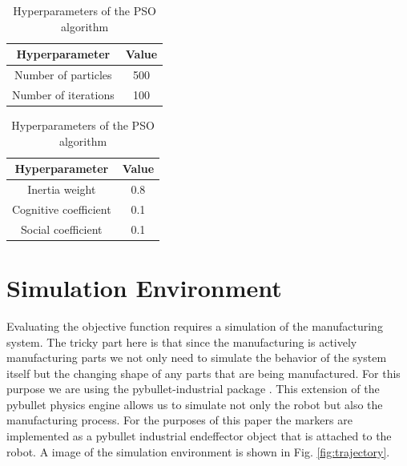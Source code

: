 \documentclass{svproc}
\begin{document}
\begin{table}
    \centering
    \caption{Hyperparameters of the PSO algorithm}
    \begin{minipage}{.45\linewidth}
        \centering
        \begin{tabular}{c|c}
            Hyperparameter & Value \\
            \hline
            Number of particles & 500 \\
            Number of iterations & 100 \\
        \end{tabular}
    \end{minipage}%
    \hspace{0.01\linewidth}%
    \begin{minipage}{.45\linewidth}
        \centering
        \begin{tabular}{c|c}
            Hyperparameter & Value \\
            \hline
            Inertia weight & 0.8 \\
            Cognitive coefficient & 0.1 \\
            Social coefficient & 0.1 \\
        \end{tabular}
    \end{minipage}

    \label{tab:hyperparameters}
\end{table}


\section{Simulation Environment}
Evaluating the objective function requires a simulation of the manufacturing system.
The tricky part here is that since the manufacturing is actively manufacturing parts we not only need to simulate the behavior of the system itself but the changing shape of any parts that are being manufactured.
For this purpose we are using the pybullet-industrial package \cite{pybullet_industrial}.
This extension of the pybullet physics engine allows us to simulate not only the robot but also the manufacturing process.
For the purposes of this paper the markers are implemented as a pybullet industrial endeffector object that is attached to the robot.
A image of the simulation environment is shown in Fig. \ref{fig:trajectory}.
\end{document}
